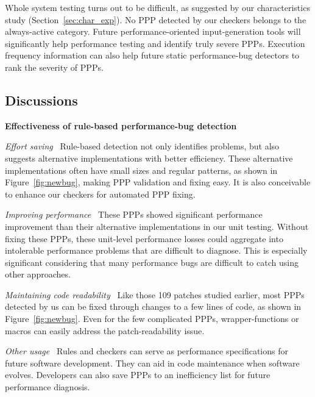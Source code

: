 Whole system testing turns out to be difficult, as suggested by our
characteristics study (Section~\ref{sec:char_exp}). 
No PPP detected by our checkers belongs to the always-active category. 
Future performance-oriented input-generation tools will significantly
help performance testing and identify truly severe PPPs. Execution frequency
information can also help future static performance-bug detectors to rank 
the severity of PPPs.



\subsection{Discussions}

{\bf Effectiveness of rule-based performance-bug detection\ }

{\it Effort saving\ } Rule-based detection not only identifies problems, but
also suggests alternative implementations with better efficiency.
These alternative implementations often
have small sizes and regular patterns,
as shown in Figure~\ref{fig:newbug}, 
making PPP validation and fixing easy.
It is also conceivable to enhance our checkers for automated PPP fixing. 

{\it Improving performance\ }
These PPPs showed 
significant performance improvement than their alternative implementations
in our unit testing. Without fixing these PPPs,
these unit-level performance losses could aggregate into intolerable
performance problems that are difficult to diagnose. 
This is especially significant considering that many performance bugs are
difficult to catch using other approaches.


{\it Maintaining code readability\ }
Like those 109 patches studied earlier, 
most PPPs detected by us can be fixed through changes to a few lines of code,
as shown in Figure~\ref{fig:newbug}.
Even for the few complicated PPPs, wrapper-functions or 
macros can easily address the patch-readability issue.

{\it Other usage\ }
Rules and checkers can serve as performance specifications for future 
software
development. They can aid in code maintenance when software evolves.
Developers can also save PPPs to an inefficiency list for future performance 
diagnosis.

